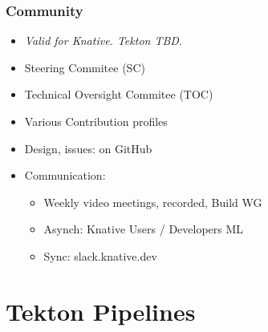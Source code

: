 \documentclass[aspectratio=169,11pt,hyperref={colorlinks=true}]{beamer}
\begin{document}
\begin{lblackrwhiteframe}
\begin{grayframe}
  \frametitle{Community}
  \begin{itemize}
    \item {\em Valid for Knative. Tekton TBD.}
    \item Steering Commitee (SC)
    \item Technical Oversight Commitee (TOC)
    \item Various Contribution profiles
    \item Design, issues: on GitHub
    \item Communication:
    \begin{itemize}
      \item Weekly video meetings, recorded, Build WG
      \item Asynch: Knative Users / Developers ML
      \item Sync: slack.knative.dev
    \end{itemize}
  \end{itemize}
\end{grayframe}

\section{Tekton Pipelines}

\end{lblackrwhiteframe}
\end{document}
